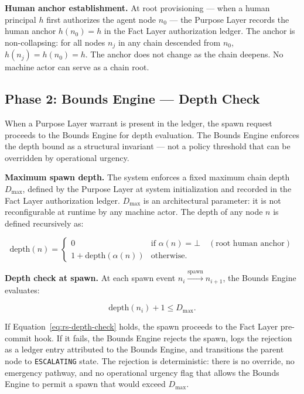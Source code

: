 \medskip
\noindent\textbf{Human anchor establishment.} At root provisioning — when a human principal $h$ first authorizes the agent node $n_0$ — the Purpose Layer records the human anchor $h(n_0) = h$ in the Fact Layer authorization ledger. The anchor is non-collapsing: for all nodes $n_j$ in any chain descended from $n_0$, $h(n_j) = h(n_0) = h$. The anchor does not change as the chain deepens. No machine actor can serve as a chain root.

\subsection{Phase 2: Bounds Engine — Depth Check}
\label{sec:rs-phase2}

When a Purpose Layer warrant is present in the ledger, the spawn request proceeds to the Bounds Engine for depth evaluation. The Bounds Engine enforces the depth bound as a structural invariant — not a policy threshold that can be overridden by operational urgency.

\medskip
\noindent\textbf{Maximum spawn depth.} The system enforces a fixed maximum chain depth $D_{\max}$, defined by the Purpose Layer at system initialization and recorded in the Fact Layer authorization ledger. $D_{\max}$ is an architectural parameter: it is not reconfigurable at runtime by any machine actor. The depth of any node $n$ is defined recursively as:

\begin{equation}
\text{depth}(n) =
\begin{cases}
0 & \text{if } \alpha(n) = \bot \quad (\text{root human anchor}) \\[6pt]
1 + \text{depth}(\alpha(n)) & \text{otherwise}.
\end{cases}
\label{eq:rs-depth}
\end{equation}

\medskip
\noindent\textbf{Depth check at spawn.} At each spawn event $n_i \xrightarrow{\text{spawn}} n_{i+1}$, the Bounds Engine evaluates:

\begin{equation}
\text{depth}(n_i) + 1 \leq D_{\max}.
\label{eq:rs-depth-check}
\end{equation}

If Equation~\ref{eq:rs-depth-check} holds, the spawn proceeds to the Fact Layer pre-commit hook. If it fails, the Bounds Engine rejects the spawn, logs the rejection as a ledger entry attributed to the Bounds Engine, and transitions the parent node to \texttt{ESCALATING} state. The rejection is deterministic: there is no override, no emergency pathway, and no operational urgency flag that allows the Bounds Engine to permit a spawn that would exceed $D_{\max}$.

